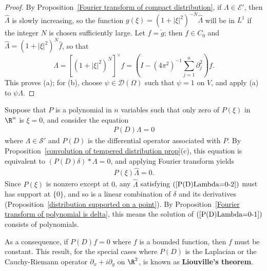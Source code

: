 \begin{proof}
By Proposition~\ref{Fourier transform of compact distribution}, if $\Lambda\in\mathscr{E}'$, then $\hat{\Lambda}$ is slowly increasing, so the function $g(\xi)=(1+|\xi|^2)^{-N}\hat{\Lambda}$ will be in $L^1$ if the integer $N$ is chosen sufficiently large. Let $f=\check{g}$; then $f\in C_0$ and $\hat{\Lambda}=(1+|\xi|^2)^N\hat{f}$, so that
\[\Lambda=[(1+|\xi|^2)^N]^{\vee}f=(I-(4\pi^2)^{-1}\sum_{j=1}^{n}\partial_j^2)f.\]
This proves (a); for (b), choose $\psi\in\mathscr{D}(\Omega)$ such that $\psi=1$ on $V$, and apply (a) to $\psi\Lambda$.
\end{proof}
\begin{example}
Suppose that $P$ is a polynomial in $n$ variables such that only zero of $P(\xi)$ in $\R^n$ is $\xi=0$, and consider the equation
\begin{align}\label{P(D)Lambda=0-1}
P(D)\Lambda=0
\end{align}
where $\Lambda\in\mathscr{S}'$ and $P(D)$ is the differential operator associated with $P$. By Proposition~\ref{convolution of tempered distribution prop}(c), this equation is equivalent to $(P(D)\delta)\ast\Lambda=0$, and applying Fourier transform yields
\begin{align}\label{P(D)Lambda=0-2}
P(\xi)\hat{\Lambda}=0.
\end{align}
Since $P(\xi)$ is nonzero except at $0$, any $\hat{\Lambda}$ satisfying $(\ref{P(D)Lambda=0-2})$ must has support at $\{0\}$, and so is a linear combination of $\delta$ and its derivatives (Proposition~\ref{distribution supported on a point}). By Proposition~\ref{Fourier transform of polynomial is delta}, this means the solution of $(\ref{P(D)Lambda=0-1})$ consists of polynomials.\par
As a consequence, if $P(D)f=0$ where $f$ is a bounded function, then $f$ must be constant. This result, for the special cases where $P(D)$ is the Laplacian or the Cauchy-Riemann operator $\partial_x+i\partial_y$ on $\R^2$, is known as \textbf{Liouville's theorem}.
\end{example}
